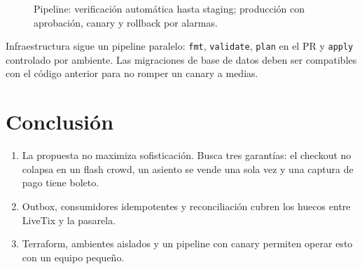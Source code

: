 \documentclass[11pt,a4paper]{article}
\begin{document}
\begin{figure}[H]
{%
}
\caption{Pipeline: verificación automática hasta staging; producción con aprobación, canary y rollback por alarmas.}
\end{figure}

Infraestructura sigue un pipeline paralelo: \texttt{fmt}, \texttt{validate}, \texttt{plan} en el PR y \texttt{apply} controlado por ambiente. Las migraciones de base de datos deben ser compatibles con el código anterior para no romper un canary a medias.

\section*{Conclusión}

\begin{enumerate}
    \item La propuesta no maximiza sofisticación. Busca tres garantías: el checkout no colapsa en un flash crowd, un asiento se vende una sola vez y una captura de pago tiene boleto.
    \item Outbox, consumidores idempotentes y reconciliación cubren los huecos entre LiveTix y la pasarela.
    \item Terraform, ambientes aislados y un pipeline con canary permiten operar esto con un equipo pequeño.
\end{enumerate}
\end{document}
